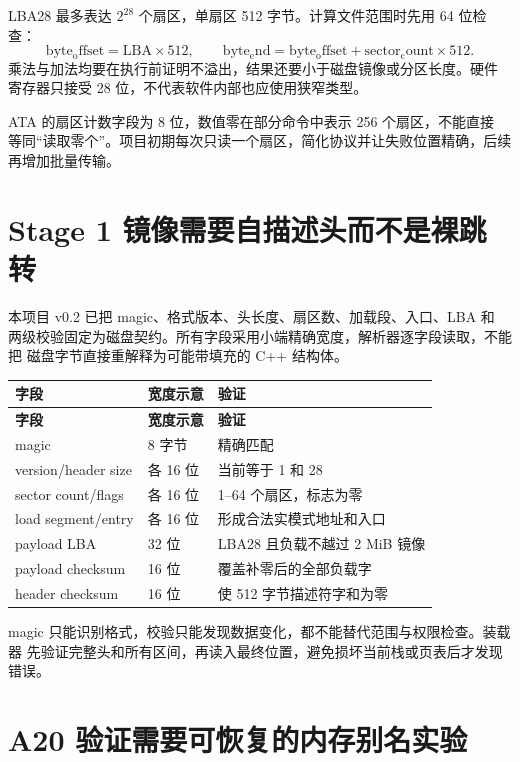 LBA28 最多表达 \(2^{28}\) 个扇区，单扇区 512 字节。计算文件范围时先用
64 位检查：
\[
  \mathrm{byte_offset}=\mathrm{LBA}\times512,\qquad
  \mathrm{byte_end}=\mathrm{byte_offset}+
  \mathrm{sector_count}\times512.
\]
乘法与加法均要在执行前证明不溢出，结果还要小于磁盘镜像或分区长度。硬件
寄存器只接受 28 位，不代表软件内部也应使用狭窄类型。

ATA 的扇区计数字段为 8 位，数值零在部分命令中表示 256 个扇区，不能直接
等同“读取零个”。项目初期每次只读一个扇区，简化协议并让失败位置精确，后续
再增加批量传输。

\section{Stage 1 镜像需要自描述头而不是裸跳转}

本项目 v0.2 已把 magic、格式版本、头长度、扇区数、加载段、入口、LBA 和
两级校验固定为磁盘契约。所有字段采用小端精确宽度，解析器逐字段读取，不能把
磁盘字节直接重解释为可能带填充的 C++ 结构体。

\begin{longtable}{L{0.23\textwidth}L{0.18\textwidth}L{0.43\textwidth}}
\toprule
\textbf{字段} & \textbf{宽度示意} & \textbf{验证}\\
\midrule
\endfirsthead
\toprule
\textbf{字段} & \textbf{宽度示意} & \textbf{验证}\\
\midrule
\endhead
magic & 8 字节 & 精确匹配 \\
version/header size & 各 16 位 & 当前等于 1 和 28\\
sector count/flags & 各 16 位 & 1--64 个扇区，标志为零\\
load segment/entry & 各 16 位 & 形成合法实模式地址和入口\\
payload LBA & 32 位 & LBA28 且负载不越过 2 MiB 镜像\\
payload checksum & 16 位 & 覆盖补零后的全部负载字\\
header checksum & 16 位 & 使 512 字节描述符字和为零\\
\bottomrule
\end{longtable}

magic 只能识别格式，校验只能发现数据变化，都不能替代范围与权限检查。装载器
先验证完整头和所有区间，再读入最终位置，避免损坏当前栈或页表后才发现错误。

\section{A20 验证需要可恢复的内存别名实验}


